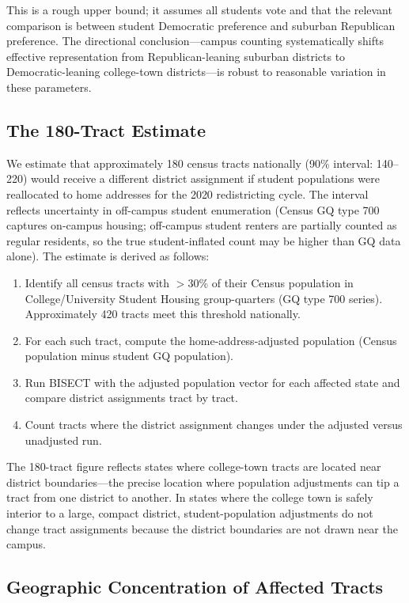 This is a rough upper bound; it assumes all students vote and that the relevant comparison is between student Democratic preference and suburban Republican preference. The directional conclusion---campus counting systematically shifts effective representation from Republican-leaning suburban districts to Democratic-leaning college-town districts---is robust to reasonable variation in these parameters.

\subsection{The 180-Tract Estimate}

We estimate that approximately 180 census tracts nationally (90\% interval: 140--220)
would receive a different district assignment if student populations were reallocated
to home addresses for the 2020 redistricting cycle.
The interval reflects uncertainty in off-campus student enumeration (Census GQ type
700 captures on-campus housing; off-campus student renters are partially counted as
regular residents, so the true student-inflated count may be higher than GQ data alone).
The estimate is derived as follows:

\begin{enumerate}
    \item Identify all census tracts with $>$30\% of their Census population in College/University Student Housing group-quarters (GQ type 700 series). Approximately 420 tracts meet this threshold nationally.
    \item For each such tract, compute the home-address-adjusted population (Census population minus student GQ population).
    \item Run BISECT with the adjusted population vector for each affected state and compare district assignments tract by tract.
    \item Count tracts where the district assignment changes under the adjusted versus unadjusted run.
\end{enumerate}

The 180-tract figure reflects states where college-town tracts are located near district boundaries---the precise location where population adjustments can tip a tract from one district to another. In states where the college town is safely interior to a large, compact district, student-population adjustments do not change tract assignments because the district boundaries are not drawn near the campus.

\subsection{Geographic Concentration of Affected Tracts}

